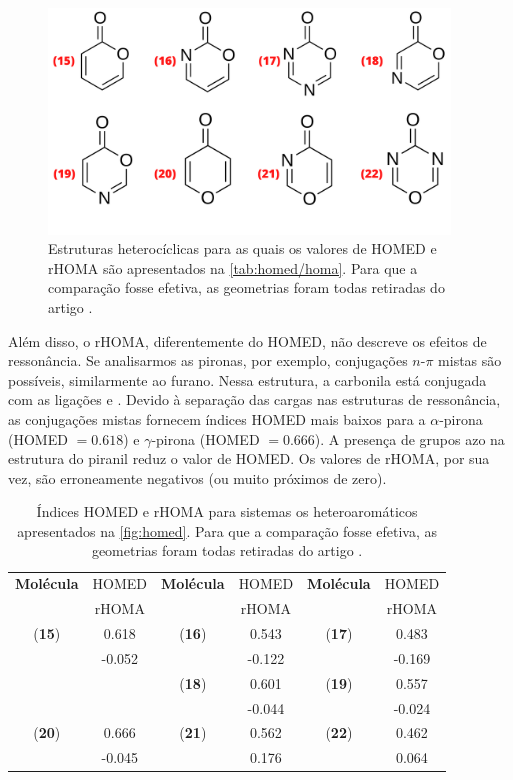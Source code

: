 \begin{figure}[htb]
\caption{\label{fig:homed/2} Estruturas heterocíclicas para as quais os valores de \gls{HOMED} e \gls{rHOMA} são apresentados na \autoref{tab:homed/homa}. Para que a comparação fosse efetiva, as geometrias foram todas retiradas do artigo \cite{giov2020}.}
	\begin{center}
		\includegraphics[width=0.95\textwidth]{images/18.png}
	\end{center}
\end{figure}

Além disso, o \gls{rHOMA}, diferentemente do \gls{HOMED}, não descreve os efeitos de ressonância. Se analisarmos as pironas, por exemplo, conjugações $n$-$\pi$ mistas são possíveis, similarmente ao furano. Nessa estrutura, a carbonila está conjugada com as ligações  e . Devido à separação das cargas nas estruturas de ressonância, as conjugações mistas fornecem índices \gls{HOMED} mais baixos para a $\alpha$-pirona (\gls{HOMED} $=0.618$) e $\gamma$-pirona (\gls{HOMED} $=0.666$). A presença de grupos azo na estrutura do piranil reduz o valor de \gls{HOMED}. Os valores de \gls{rHOMA}, por sua vez, são erroneamente negativos (ou muito próximos de zero).

\begin{table}[htb]
	\centering
	\caption{\label{tab:homed/homa} Índices \gls{HOMED} e \gls{rHOMA} para sistemas os heteroaromáticos apresentados na \autoref{fig:homed}. Para que a comparação fosse efetiva, as geometrias foram todas retiradas do artigo \cite{giov2020}.}
	\begin{tabular}{cccccc}
		\toprule
	\textbf{Molécula} & \gls{HOMED} & \textbf{Molécula} & \gls{HOMED} & \textbf{Molécula} & \gls{HOMED}
 \\
  & \gls{rHOMA} & & \gls{rHOMA} & & \gls{rHOMA}
 \\
		\midrule
    (\textbf{15}) & 0.618 & (\textbf{16}) & 0.543 & (\textbf{17}) & 0.483 \\
     & -0.052 &  & -0.122 &  & -0.169 \\
    & & (\textbf{18}) & 0.601 & (\textbf{19}) & 0.557 \\
    & &  & -0.044 & & -0.024 \\
    (\textbf{20}) & 0.666 & (\textbf{21}) & 0.562 & (\textbf{22}) & 0.462 \\
    & -0.045 & & 0.176 & & 0.064 \\
    \bottomrule
	\end{tabular}
\end{table}


